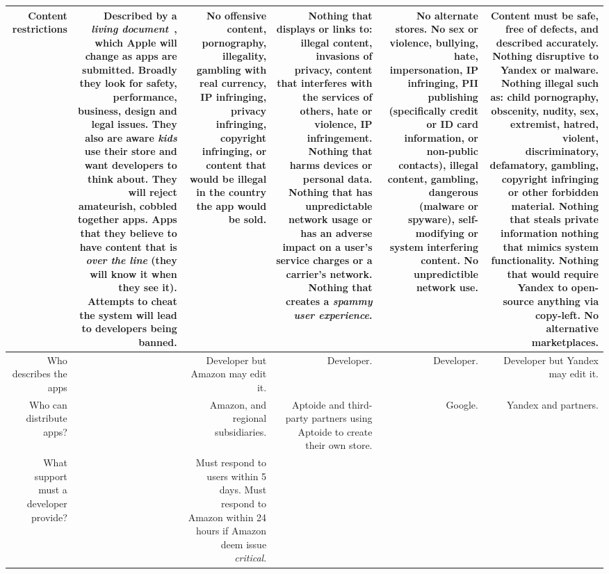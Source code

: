 \documentclass[thesis.tex]{subfiles}
\begin{document}
{{\begin{longtable}{RRRRRR}
      \\\midrule
    Content restrictions
    & Described by a \emph{living document}~\cite{apple_app_nodate}, which Apple will change as apps are submitted.  Broadly they look for safety, performance, business, design and legal issues. They also are aware \emph{kids} use their store and want developers to think about.  They will reject amateurish, cobbled together apps.  Apps that they believe to have content that is \emph{over the line} (they will know it when they see it).  Attempts to cheat the system will lead to developers being banned. 
      & No offensive content, pornography, illegality, gambling with real currency, IP infringing, privacy infringing, copyright infringing, or content that would be illegal in the country the app would be sold.
      & Nothing that displays or links to: illegal content, invasions of privacy, content that interferes with the services of others, hate or violence, IP infringement. Nothing that harms devices or personal data.  Nothing that has unpredictable network usage or has an adverse impact on a user's service charges or a carrier's network.  Nothing that creates a \emph{spammy user experience}.
      & No alternate stores. No sex or violence, bullying, hate, impersonation, IP infringing, PII publishing (specifically credit or ID card information, or non-public contacts), illegal content, gambling, dangerous (malware or spyware), self-modifying or system interfering content. No unpredictible network use.
      & Content must be safe, free of defects, and described accurately.  Nothing disruptive to Yandex or malware.  Nothing illegal such as: child pornography, obscenity, nudity, sex, extremist, hatred, violent, discriminatory, defamatory, gambling, copyright infringing or other forbidden material.  Nothing that steals private information nothing that mimics system functionality.  Nothing that would require Yandex to open-source anything via copy-left.  No alternative marketplaces.
      \\\midrule
    Who describes the apps
      &
      & Developer but Amazon may edit it.
      & Developer.
      & Developer.
      & Developer but Yandex may edit it.
      \\\midrule
    Who can distribute apps?
      &
      & Amazon, and regional subsidiaries.
      & Aptoide and third-party partners using Aptoide to create their own store.
      & Google.
      & Yandex and partners.
      \\\midrule
    What support must a developer provide?
      & 
      & Must respond to users within 5 days.  Must respond to Amazon within 24 hours if Amazon deem issue \emph{critical}.

\end{longtable}}}
\end{document}
